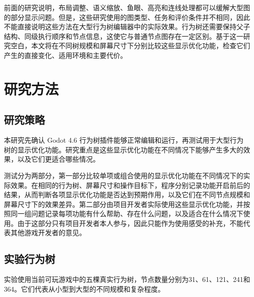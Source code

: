 \documentclass[11pt,a4paper,oneside,extrafontsizes]{memoir}
\begin{document}
前面的研究说明，布局调整、语义缩放、鱼眼、高亮和连线处理都可以缓解大型图的部分显示问题。但是，这些研究使用的图类型、任务和评价条件并不相同，因此不能直接说明这些方法在大型行为树编辑器中的实际效果。行为树还需要保持父子结构、同级执行顺序和节点信息，这使它与普通节点图存在一定区别。基于这一研究空白，本文将在不同树规模和屏幕尺寸下分别比较这些显示优化功能，检查它们产生的直接变化、适用环境和主要代价。

\chapter{研究方法}

\section{研究策略}

本研究先确认 Godot 4.6 行为树插件能够正常编辑和运行，再测试用于大型行为树的显示优化功能。研究重点是这些显示优化功能在不同情况下能够产生多大的效果，以及它们更适合哪些情况。

测试分为两部分，第一部分比较单项或组合使用的显示优化功能在不同情况下的实际效果。在相同的行为树、屏幕尺寸和操作目标下，程序分别记录功能开启前后的结果，从而判断各项显示优化功能是否达到预期作用，以及它们在不同节点规模和屏幕尺寸下的效果差异。第二部分由项目开发者实际使用这些显示优化功能，并按照同一组问题记录每项功能有什么帮助、存在什么问题，以及适合在什么情况下使用。由于这部分只有项目开发者本人参与，因此只能作为使用感受的补充，不能代表其他游戏开发者的意见。

\section{实验行为树}

实验使用当前可玩游戏中的五棵真实行为树，节点数量分别为31、61、121、241和364。它们代表从小型到大型的不同规模和复杂程度。
\end{document}
